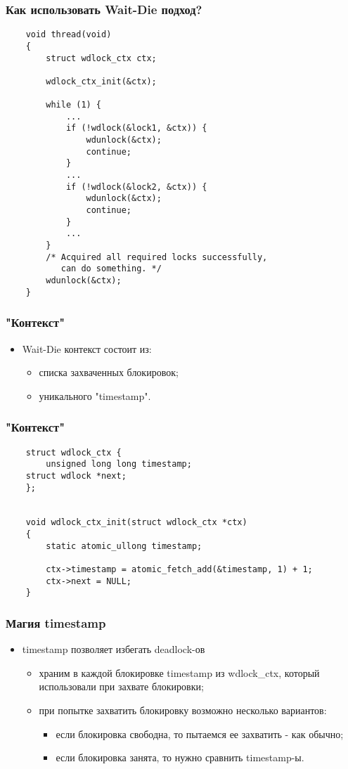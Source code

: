 \begin{frame}[fragile]
\frametitle{Как использовать Wait-Die подход?}
\begin{lstlisting}
    void thread(void)
    {
        struct wdlock_ctx ctx;

        wdlock_ctx_init(&ctx);

        while (1) {
            ...
            if (!wdlock(&lock1, &ctx)) {
                wdunlock(&ctx);
                continue;
            }
            ...
            if (!wdlock(&lock2, &ctx)) {
                wdunlock(&ctx);
                continue;
            }
            ...
        }
        /* Acquired all required locks successfully,
           can do something. */
        wdunlock(&ctx);
    }
\end{lstlisting}
\end{frame}

\begin{frame}
\frametitle{"Контекст"}
\begin{itemize}
    \item<1->Wait-Die контекст состоит из:
    \begin{itemize}
        \item<2->списка захваченных блокировок;
        \item<3->уникального "timestamp".
    \end{itemize}
\end{itemize}
\end{frame}

\begin{frame}[fragile]
\frametitle{"Контекст"}
\begin{lstlisting}
    struct wdlock_ctx {
        unsigned long long timestamp;
	struct wdlock *next;
    };


    void wdlock_ctx_init(struct wdlock_ctx *ctx)
    {
        static atomic_ullong timestamp;

        ctx->timestamp = atomic_fetch_add(&timestamp, 1) + 1;
        ctx->next = NULL;
    }
\end{lstlisting}
\end{frame}

\begin{frame}
\frametitle{Магия timestamp}
\begin{itemize}
    \item<1->timestamp позволяет избегать deadlock-ов
    \begin{itemize}
        \item<2->храним в каждой блокировке timestamp из wdlock\_ctx, который
             использовали при захвате блокировки;
        \item<3->при попытке захватить блокировку возможно несколько вариантов:
        \begin{itemize}
            \item<4->если блокировка свободна, то пытаемся ее захватить - как
                 обычно;
            \item<5->если блокировка занята, то нужно сравнить timestamp-ы.
        \end{itemize}
    \end{itemize}
\end{itemize}
\end{frame}

